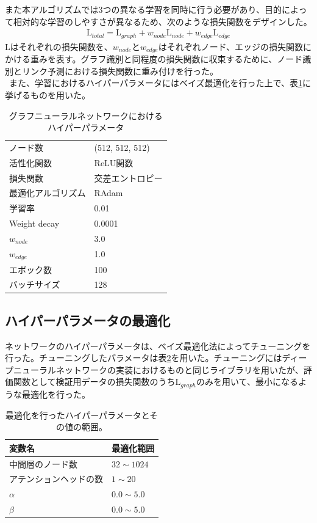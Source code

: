 また本アルゴリズムでは3つの異なる学習を同時に行う必要があり、目的によって相対的な学習のしやすさが異なるため、次のような損失関数をデザインした。\\
\begin{align}
\mathrm{L}_{total} = \mathrm{L}_{graph} + w_{node} \mathrm{L}_{node} + w_{edge} \mathrm{L}_{edge}
\end{align}
$\mathrm{L}$はそれぞれの損失関数を、$w_{node}とw_{edge}$はそれぞれノード、エッジの損失関数にかける重みを表す。グラフ識別と同程度の損失関数に収束するために、ノード識別とリンク予測における損失関数に重み付けを行った。\\
\ また、学習におけるハイパーパラメータにはベイズ最適化を行った上で、表\ref{gnnsetting}に挙げるものを用いた。
\begin{table}[H]
 \centering
  \begin{tabular}{ l  l }
   \hline
   ノード数 & (512, 512, 512)\\
   活性化関数 & ReLU関数\\
   損失関数 & 交差エントロピー\\
   最適化アルゴリズム & RAdam\\
   学習率 & 0.01\\
   Weight decay & 0.0001\\
    $w_{node}$ & 3.0\\
    $w_{edge}$ & 1.0\\
   エポック数 & 100\\
   バッチサイズ & 128\\
   \hline
  \end{tabular}
  \label{gnnsetting}
  \caption{グラフニューラルネットワークにおけるハイパーパラメータ}
\end{table}
\subsection{ハイパーパラメータの最適化}
ネットワークのハイパーパラメータは、ベイズ最適化法によってチューニングを行った。チューニングしたパラメータは表\ref{gnnoptuna}を用いた。チューニングにはディープニューラルネットワークの実装におけるものと同じライブラリを用いたが、評価関数として検証用データの損失関数のうち$ \mathrm{L}_{graph}$のみを用いて、最小になるような最適化を行った。
\begin{table}[H]
\centering
 \begin{tabular}{ l  l }
 \hline
 変数名 & 最適化範囲\\
 \hline
 \hline
 中間層のノード数 & $32 \sim 1024$\\
 アテンションヘッドの数 & $1 \sim 20$\\
 $\alpha$ & $0.0 \sim 5.0$\\
 $\beta$ & $0.0 \sim 5.0$\\
  \hline
 \end{tabular}
 \label{gnnoptuna}
 \caption{最適化を行ったハイパーパラメータとその値の範囲。}
\end{table}
